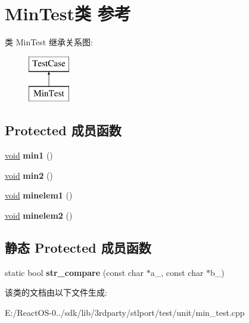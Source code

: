 \hypertarget{class_min_test}{}\section{Min\+Test类 参考}
\label{class_min_test}
类 Min\+Test 继承关系图\+:\begin{figure}[H]
\begin{center}
\leavevmode
\includegraphics[height=2.000000cm]{class_min_test}
\end{center}
\end{figure}
\subsection*{Protected 成员函数}
\begin{DoxyCompactItemize}
\item 
\mbox{\label{class_min_test_ab99122dd6c288b3db38cb07876bd1cfa}} 
\hyperlink{interfacevoid}{void} {\bfseries min1} ()
\item 
\mbox{\label{class_min_test_a1bc6414a55984cd2c08154527cd80011}} 
\hyperlink{interfacevoid}{void} {\bfseries min2} ()
\item 
\mbox{\label{class_min_test_a1ef35f11460e6821a7f8d6b1e98e17fd}} 
\hyperlink{interfacevoid}{void} {\bfseries minelem1} ()
\item 
\mbox{\label{class_min_test_a65cedb76c3a59c8e677037b6ea942eb1}} 
\hyperlink{interfacevoid}{void} {\bfseries minelem2} ()
\end{DoxyCompactItemize}
\subsection*{静态 Protected 成员函数}
\begin{DoxyCompactItemize}
\item 
\mbox{\label{class_min_test_a88c74fed6984faf52c6112f88ab83b03}} 
static bool {\bfseries str\+\_\+compare} (const char $\ast$a\+\_\+, const char $\ast$b\+\_\+)
\end{DoxyCompactItemize}


该类的文档由以下文件生成\+:\begin{DoxyCompactItemize}
\item 
E\+:/\+React\+O\+S-\/0../sdk/lib/3rdparty/stlport/test/unit/min\+\_\+test.\+cpp\end{DoxyCompactItemize}
